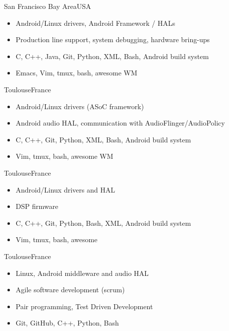 \documentclass[a4paper,11pt]{moderncv}
\begin{document}
{San Francisco Bay Area}{USA}
{
    \begin{itemize}
        \item Android/Linux drivers, Android Framework / HALs
        \item Production line support, system debugging, hardware bring-ups
        \item C, C++, Java, Git, Python, XML, Bash, Android build system
        \item Emacs, Vim, tmux, bash, awesome WM
    \end{itemize}
}
{Toulouse}{France}
{
    \begin{itemize}
        \item Android/Linux drivers (ASoC framework)
        \item Android audio HAL, communication with AudioFlinger/AudioPolicy
        \item C, C++, Git, Python, XML, Bash, Android build system
        \item Vim, tmux, bash, awesome WM
    \end{itemize}
}

{Toulouse}{France}
{
    \begin{itemize}
        \item Android/Linux drivers and HAL
        \item DSP firmware
        \item C, C++, Git, Python, Bash, XML, Android build system
        \item Vim, tmux, bash, awesome
    \end{itemize}
}

{Toulouse}{France}
{
    \begin{itemize}
        \item Linux, Android middleware and audio HAL
        \item Agile software development (scrum)
        \item Pair programming, Test Driven Development
        \item Git, GitHub, C++, Python, Bash
    \end{itemize}
}
\end{document}
